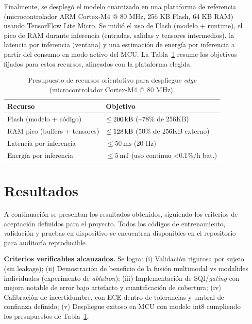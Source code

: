 \documentclass[10pt,a4paper,twocolumn]{article}
\begin{document}
Finalmente, se despleg\'o el modelo cuantizado en una plataforma de referencia (microcontrolador ARM Cortex-M4 @ 80 MHz, 256 KB Flash, 64 KB RAM) usando TensorFlow Lite Micro. Se midi\'o el uso de Flash (modelo + runtime), el pico de RAM durante inferencia (entradas, salidas y tensores intermedios), la latencia por inferencia (ventana) y una estimaci\'on de energ\'ia por inferencia a partir del consumo en modo activo del MCU. La Tabla~\ref{tab:edgebudget} resume los objetivos fijados para estos recursos, alineados con la plataforma elegida.
\begin{table}[t]
\centering
\caption{Presupuesto de recursos orientativo para despliegue \emph{edge} (microcontrolador Cortex-M4 @ 80 MHz).}
\label{tab:edgebudget}
\begin{tabular}{@{}p{}p{}@{}}
\toprule
\textbf{Recurso} & \textbf{Objetivo} \\
\midrule
Flash (modelo + c\'odigo) & $\leq \SI{200}{\kilo\byte}$ (\textasciitilde78\% de 256KB) \\
RAM pico (buffers + tensores) & $\leq \SI{128}{\kilo\byte}$ (50\% de 256KB externo) \\
Latencia por inferencia & $\leq \SI{50}{\milli\second}$ (20 Hz) \\
Energ\'ia por inferencia & $\leq 5~\si{\milli\joule}$ (uso continuo <0.1\%/h bat.)\\
\bottomrule
\end{tabular}
\end{table}

\section{Resultados}

A continuaci\'on se presentan los resultados obtenidos, siguiendo los criterios de aceptaci\'on definidos para el proyecto. Todos los c\'odigos de entrenamiento, validaci\'on y pruebas en dispositivo se encuentran disponibles en el repositorio para auditor\'ia reproducible.

\begin{tcolorbox}
\textbf{Criterios verificables alcanzados.} Se logra: (i) Validaci\'on rigurosa por sujeto (sin leakage); (ii) Demostraci\'on de beneficio de la fusi\'on multimodal vs modalides individuales (experimento de \emph{ablation}); (iii) Implementaci\'on de SQI/\emph{gating} con mejora notable de error bajo artefacto y cuantificaci\'on de cobertura; (iv) Calibraci\'on de incertidumbre, con ECE dentro de tolerancias y umbral de confianza definido; (v) Despliegue exitoso en MCU con modelo int8 cumpliendo los presupuestos de Tabla~\ref{tab:edgebudget}.
\end{tcolorbox}
\end{document}
